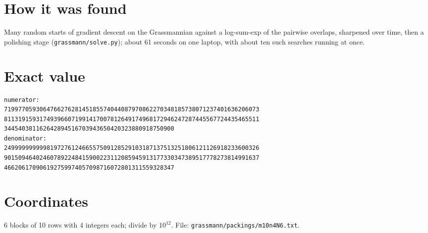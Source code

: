 \documentclass[11pt,a4paper]{article}
\begin{document}
\section{How it was found}
Many random starts of gradient descent on the Grassmannian against a log-sum-exp of the pairwise overlaps, sharpened over time, then a polishing stage (\texttt{grassmann/solve.py}); about 61 seconds on one laptop, with about ten such searches running at once.


\appendix
\section{Exact value}
{\small
\begin{verbatim}
numerator:
719977059306476627628145185574044087970862270348185738071237401636206073
811319159317493966071991417007812649174968172946247287445567724435465511
344540381162642894516703943650420323880918750900
denominator:
249999999999819727612466557509128529103187137513251806121126918233600326
901509464024607892248415900223112085945913177330347389517778273814991637
466206170906192759974057098716072801311559328347
\end{verbatim}}

\section{Coordinates}
6 blocks of 10 rows with 4 integers each; divide by $10^{12}$. File: \texttt{grassmann/packings/m10n4N6.txt}.
{\tiny
\begin{multicols}{3}
\end{multicols}}
\end{document}
